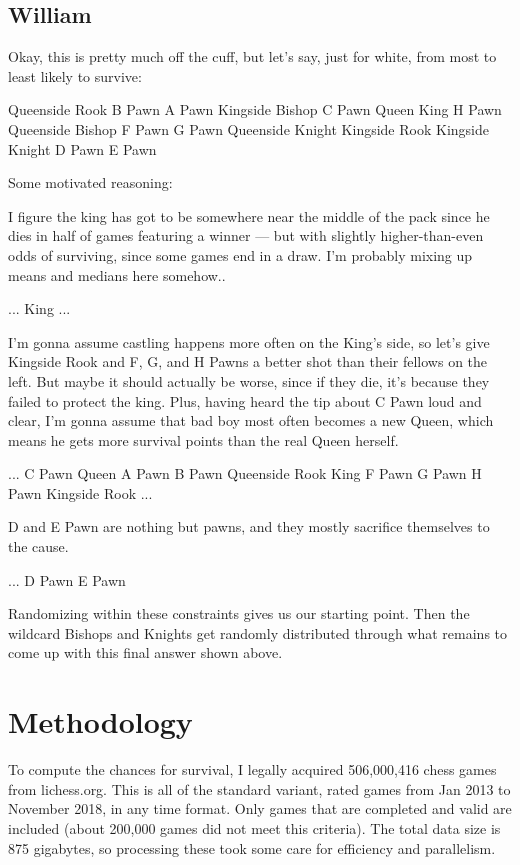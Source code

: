 \documentclass[twocolumn]{article}
\begin{document}
\subsection{William}

Okay, this is pretty much off the cuff, but let’s say, just for white,
from most to least likely to survive:

Queenside Rook
B Pawn
A Pawn
Kingside Bishop
C Pawn
Queen
King
H Pawn
Queenside Bishop
F Pawn
G Pawn
Queenside Knight
Kingside Rook
Kingside Knight
D Pawn
E Pawn

Some motivated reasoning:

I figure the king has got to be somewhere near the middle of the pack
since he dies in half of games featuring a winner — but with slightly
higher-than-even odds of surviving, since some games end in a draw.
I’m probably mixing up means and medians here somehow..

...
King
...

I’m gonna assume castling happens more often on the King’s side, so
let’s give Kingside Rook and F, G, and H Pawns a better shot than
their fellows on the left. But maybe it should actually be worse,
since if they die, it’s because they failed to protect the king. Plus,
having heard the tip about C Pawn loud and clear, I’m gonna assume
that bad boy most often becomes a new Queen, which means he gets more
survival points than the real Queen herself.

...
C Pawn
Queen
A Pawn
B Pawn
Queenside Rook
King
F Pawn
G Pawn
H Pawn
Kingside Rook
...

D and E Pawn are nothing but pawns, and they mostly sacrifice
themselves to the cause.

...
D Pawn
E Pawn

Randomizing within these constraints gives us our starting point. Then
the wildcard Bishops and Knights get randomly distributed through what
remains to come up with this final answer shown above.

\section{Methodology}

To compute the chances for survival, I legally acquired 506,000,416
chess games from lichess.org. This is all of the standard variant,
rated games from Jan 2013 to November 2018, in any time format. Only
games that are completed and valid are included (about 200,000 games
did not meet this criteria). The total data size is 875 gigabytes, so
processing these took some care for efficiency and parallelism.
\end{document}
